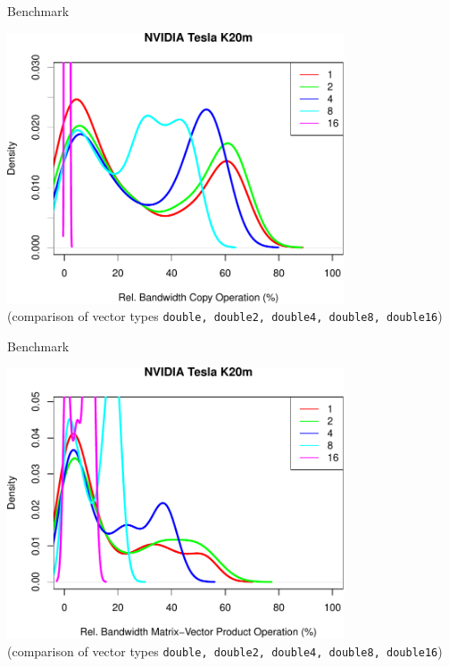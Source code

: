 \begin{frame}{Benchmark}
  \begin{center} \includegraphics[width=0.75\textwidth]{figures/k20m_double_hist_vec_copy-crop} \\
                  \footnotesize (comparison of vector types \texttt{double, double2, double4, double8, double16}) \end{center}
\end{frame}

\begin{frame}{Benchmark}
  \begin{center} \includegraphics[width=0.75\textwidth]{figures/k20m_double_hist_vec_gemv-crop} \\
                  \footnotesize (comparison of vector types \texttt{double, double2, double4, double8, double16})  \end{center}
\end{frame}





